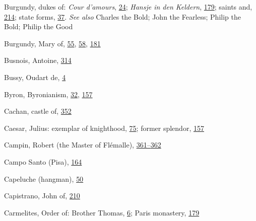 Burgundy, dukes of: \emph{Cour d'amours},
\protect\hyperlink{08_Chapter_One__THE_PASSIONATE_INTE.xhtmlux5cux23page_24}{24};
\emph{Hansje in den Keldern},
\protect\hyperlink{13_Chapter_Six__THE_DEPICTION_OF_TH.xhtmlux5cux23page_179}{179};
saints and,
\protect\hyperlink{14_Chapter_Seven__THE_PIOUS_PERSONA.xhtmlux5cux23page_214}{214};
state forms,
\protect\hyperlink{09_Chapter_Two__THE_CRAVING_FOR_A_M.xhtmlux5cux23page_37}{37}.
\emph{See also} Charles the Bold; John the Fearless; Philip the Bold;
Philip the Good

Burgundy, Mary of,
\protect\hyperlink{09_Chapter_Two__THE_CRAVING_FOR_A_M.xhtmlux5cux23page_55}{55},
\protect\hyperlink{09_Chapter_Two__THE_CRAVING_FOR_A_M.xhtmlux5cux23page_58}{58},
\protect\hyperlink{13_Chapter_Six__THE_DEPICTION_OF_TH.xhtmlux5cux23page_181}{181}

Busnois, Antoine,
\protect\hyperlink{20_ILLUSTRATIONS_FOLLOW_PAGE.xhtmlux5cux23page_314}{314}

Bussy, Oudart de,
\protect\hyperlink{08_Chapter_One__THE_PASSIONATE_INTE.xhtmlux5cux23page_4}{4}

Byron, Byronianism,
\protect\hyperlink{09_Chapter_Two__THE_CRAVING_FOR_A_M.xhtmlux5cux23page_32}{32},
\protect\hyperlink{12_Chapter_Five__THE_VISION_OF_DEAT.xhtmlux5cux23page_157}{157}

Cachan, castle of,
\protect\hyperlink{21_Chapter_Thirteen__IMAGE_AND_WORD.xhtmlux5cux23page_352}{352}

Caesar, Julius: exemplar of knighthood,
\protect\hyperlink{10_Chapter_Three__THE_HEROIC_DREAM.xhtmlux5cux23page_75}{75};
former splendor,
\protect\hyperlink{12_Chapter_Five__THE_VISION_OF_DEAT.xhtmlux5cux23page_157}{157}

Campin, Robert (the Master of Flémalle),
\protect\hyperlink{21_Chapter_Thirteen__IMAGE_AND_WORD.xhtmlux5cux23page_361}{361--}\protect\hyperlink{21_Chapter_Thirteen__IMAGE_AND_WORD.xhtmlux5cux23page_362}{362}

Campo Santo (Pisa),
\protect\hyperlink{12_Chapter_Five__THE_VISION_OF_DEAT.xhtmlux5cux23page_164}{164}

Capeluche (hangman),
\protect\hyperlink{09_Chapter_Two__THE_CRAVING_FOR_A_M.xhtmlux5cux23page_50}{50}

Capistrano, John of,
\protect\hyperlink{14_Chapter_Seven__THE_PIOUS_PERSONA.xhtmlux5cux23page_210}{210}

Carmelites, Order of: Brother Thomas,
\protect\hyperlink{08_Chapter_One__THE_PASSIONATE_INTE.xhtmlux5cux23page_6}{6};
Paris monastery,
\protect\hyperlink{13_Chapter_Six__THE_DEPICTION_OF_TH.xhtmlux5cux23page_179}{179}


